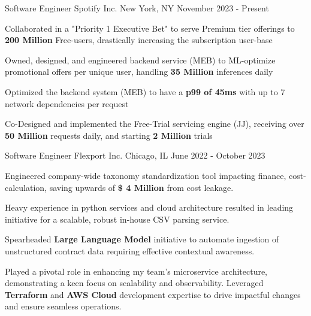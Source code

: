 

\begin{cventries}

  \cventry
  {Software Engineer} %
  {Spotify Inc.} %
  {New York, NY} %
  {November 2023 - Present} %
  {
    \begin{cvitems} %
      \item {Collaborated in a "Priority 1 Executive Bet" to serve Premium tier offerings to \textbf{200 Million} Free-users, drastically increasing the subscription user-base}
      \item {Owned, designed, and engineered backend service (MEB) to ML-optimize promotional offers per unique user, handling \textbf{35 Million} inferences daily}
      \item {Optimized the backend system (MEB) to have a \textbf{p99 of 45ms} with up to 7 network dependencies per request}
      \item {Co-Designed and implemented the Free-Trial servicing engine (JJ), receiving over \textbf{50 Million} requests daily, and starting \textbf{2 Million} trials}
    \end{cvitems}
  }

\cventry
    {Software Engineer} %
    {Flexport Inc.} %
    {Chicago, IL} %
    {June 2022 - October 2023} %
    {
      \begin{cvitems} %
        \item {Engineered company-wide taxonomy standardization tool impacting finance, cost-calculation, saving upwards of \textbf{\$ 4 Million} from cost leakage.}
        \item {Heavy experience in python services and cloud architecture resulted in leading initiative for a scalable, robust in-house CSV parsing service.}
        \item{Spearheaded \textbf{Large Language Model} initiative to automate ingestion of unstructured contract data requiring effective contextual awareness.}
        \item{Played a pivotal role in enhancing my team's microservice architecture, demonstrating a keen focus on scalability and observability. Leveraged \textbf{Terraform} and \textbf{AWS Cloud} development expertise to drive impactful changes and ensure seamless operations.}
      \end{cvitems}
    }


\end{cventries}
